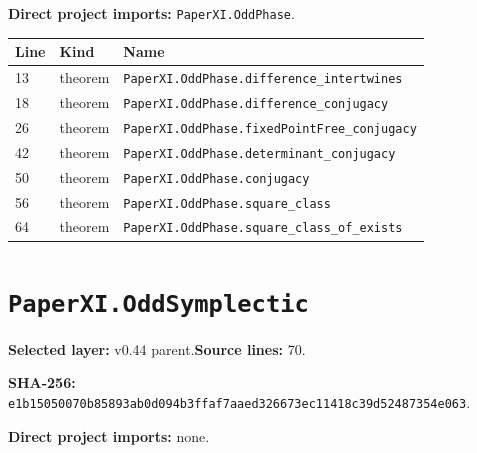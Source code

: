 \documentclass[10pt,oneside]{book}
\begin{document}

\textbf{Direct project imports:} \nolinkurl{PaperXI.OddPhase}.

\begin{longtable}{@{}p{}p{}p{}@{}}\toprule Line&Kind&Name\\\midrule\endhead

13&theorem&\nolinkurl{PaperXI.OddPhase.difference_intertwines}\\

18&theorem&\nolinkurl{PaperXI.OddPhase.difference_conjugacy}\\

26&theorem&\nolinkurl{PaperXI.OddPhase.fixedPointFree_conjugacy}\\

42&theorem&\nolinkurl{PaperXI.OddPhase.determinant_conjugacy}\\

50&theorem&\nolinkurl{PaperXI.OddPhase.conjugacy}\\

56&theorem&\nolinkurl{PaperXI.OddPhase.square_class}\\

64&theorem&\nolinkurl{PaperXI.OddPhase.square_class_of_exists}\\

\bottomrule\end{longtable}

\section{\texorpdfstring{\nolinkurl{PaperXI.OddSymplectic}}{PaperXI.OddSymplectic}}\label{module:PaperXI.OddSymplectic}

\textbf{Selected layer:} v0.44 parent.\quad\textbf{Source lines:} 70.\par\textbf{SHA-256:} {\scriptsize\nolinkurl{e1b15050070b85893ab0d094b3ffaf7aaed326673ec11418c39d52487354e063}}.


\textbf{Direct project imports:} none.
\end{document}
